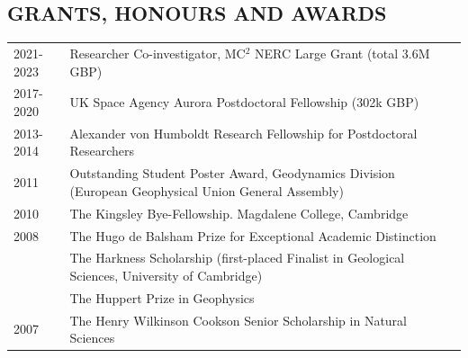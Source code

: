 \documentclass[11pt,twoside,a4paper]{article}
\begin{document}
\subsection*{GRANTS, HONOURS AND AWARDS}

\vspace{-0.5em}
\begin{table}[!h]
\centering
\begin{tabular}{L{2cm} L{13cm} L{2cm}}
2021-2023 & Researcher Co-investigator, MC$^2$ NERC Large Grant (total 3.6M GBP) & \\
2017-2020 & UK Space Agency Aurora Postdoctoral Fellowship (302k GBP) & \\
2013-2014 & Alexander von Humboldt Research Fellowship for Postdoctoral Researchers & \\
2011 & Outstanding Student Poster Award, Geodynamics Division (European Geophysical Union General Assembly) & \\
2010 & The Kingsley Bye-Fellowship. Magdalene College, Cambridge & \\
2008 & The Hugo de Balsham Prize for Exceptional Academic Distinction & \\
 & The Harkness Scholarship (first-placed Finalist in Geological Sciences, University of Cambridge) & \\
 & The Huppert Prize in Geophysics &  \\
2007 & The Henry Wilkinson Cookson Senior Scholarship in Natural Sciences &
\end{tabular}
\end{table}
\vspace{-1.5em}

\clearpage
\end{document}
